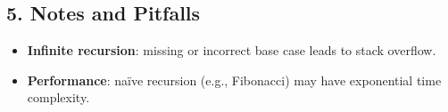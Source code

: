 \documentclass[11pt]{article}
\begin{document}
\subsection*{5. Notes and Pitfalls}
\begin{itemize}
  \item \textbf{Infinite recursion}: missing or incorrect base case leads to stack overflow.
  \item \textbf{Performance}: naïve recursion (e.g., Fibonacci) may have exponential time complexity.
\end{itemize}
\end{document}
